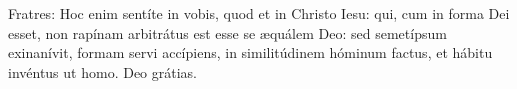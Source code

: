 Fratres: Hoc enim sentíte in vobis, quod et in Christo Iesu: qui, cum in forma Dei esset, non rapínam arbitrátus est esse se æquálem Deo: sed semetípsum exinanívit, formam servi accípiens, in similitúdinem hóminum factus, et hábitu invéntus ut homo. \rubric{\Rbar} Deo grátias.
